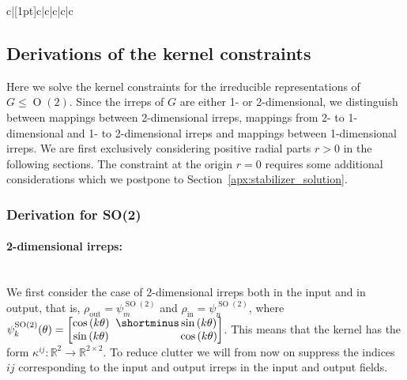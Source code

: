 \documentclass{article}
\newcommand{\apx}{Appendix\xspace
}
\newcommand{\lp}{\left(}
\newcommand{\rp}{\right)}
\DeclareMathOperator*{\Z}{\mathbb{Z}}
\DeclareMathOperator*{\N}{\mathbb{N}}
\renewcommand{\O}[1]{\ensuremath{\operatorname{O}(#1)}}
\newcommand{\SO}[1]{\ensuremath{\operatorname{SO}(#1)}}
\newcommand{\DN}{\ensuremath{\operatorname{D}_{\!N}}}
\newcommand{\PSI}[1]{
	\begin{bmatrix}
		\cos\lp#1\rp & \!\!\!         \shortminus \sin\lp#1\rp \\
		\sin\lp#1\rp & \!\!\!\phantom{\shortminus}\cos\lp#1\rp \\
	\end{bmatrix}
}
\begin{document}
\begin{landscape}
\begin{table}[h!]
{\begin{tabu}{c|[1pt]c|c|c|c|c}
			\end{tabu}}\vspace*{2ex}\captionsetup{width=.8\linewidth}
	\caption{Bases for the angular parts of $\DN$-steerable kernels for different pairs of input and output fields irreps $\psi_{j,n}$ and $\psi_{i,m}$.
		The full basis is found by instantiating these solutions for each $t\!\in\!\Z$ or $\hat{t}\!\in\!\N$.
		The different types of irreps are explained in \apx~\ref{apx:irreps}.
		The solutions here shown are for a group action where the reflection is defined around the horizontal axis ($\beta=0$).
		For different axes $\beta\neq0$ substitute $\phi$ with $\phi-\beta$.
	}\label{tab:DN_irrep_solution_appendix}\end{table}
\end{landscape}




\subsection{Derivations of the kernel constraints}
\label{apx:derivation_irrep_constraints}

Here we solve the kernel constraints for the irreducible representations of $G\leq\O2$.
Since the irreps of $G$ are either 1- or 2-dimensional, we distinguish between mappings between 2-dimensional irreps, mappings from 2- to 1-dimensional and 1- to 2-dimensional irreps and mappings between 1-dimensional irreps.
We are first exclusively considering positive radial parts $r>0$ in the following sections.
The constraint at the origin $r=0$ requires some additional considerations which we postpone to Section~\ref{apx:stabilizer_solution}.

\vspace*{1.ex}


\subsubsection{Derivation for SO(2)}
\label{apx:derivation_irrep_constraint_SO2}

\paragraph{2-dimensional irreps:}~\\[.75ex]
We first consider the case of 2-dimensional irreps both in the input and in output, that is, $\rho_\text{out} = \psi_m^{\SO2}$ and $\rho_\text{in} = \psi_n^{\SO2}$, where $\psi_k^{\SO2}(\theta)= \PSI{k \theta}$.
This means that the kernel has the form $\kappa^{ij}: \mathbb{R}^2 \to \mathbb{R}^{2\times2}$.
To reduce clutter we will from now on suppress the indices $ij$ corresponding to the input and output irreps in the input and output fields.
\end{document}

